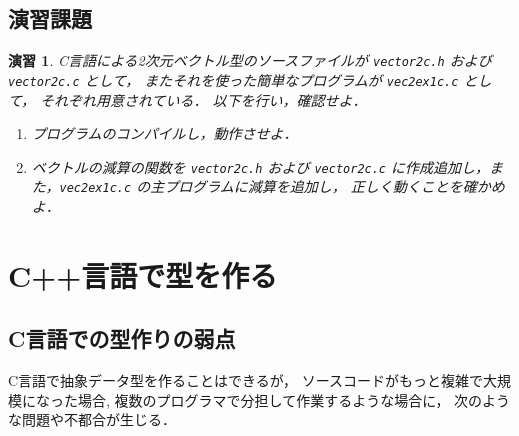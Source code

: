 \documentclass[11pt,a4,epsf]{jarticle}
\newtheorem{exerc}{演習}
\begin{document}
\subsection{演習課題}
\begin{exerc}%
C言語による2次元ベクトル型のソースファイルが
\verb+vector2c.h+ および \verb+vector2c.c+ として，
またそれを使った簡単なプログラムが \verb+vec2ex1c.c+ として，
それぞれ用意されている．
以下を行い，確認せよ．

\begin{enumerate}
\item[(1)] プログラムのコンパイルし，動作させよ．
\item[(2)] ベクトルの減算の関数を \verb+vector2c.h+ および \verb+vector2c.c+ に作成追加し，また，\verb+vec2ex1c.c+ の主プログラムに減算を追加し，
正しく動くことを確かめよ．


\end{enumerate}

\end{exerc} %


\newpage
\section{C++言語で型を作る}

\subsection{C言語での型作りの弱点}

C言語で抽象データ型を作ることはできるが，
ソースコードがもっと複雑で大規模になった場合,
複数のプログラマで分担して作業するような場合に，
次のような問題や不都合が生じる．
\end{document}
